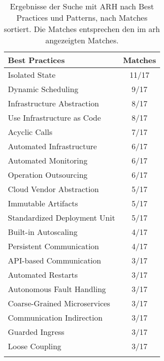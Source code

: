 \begin{table}[!htb]
\begin{minipage}{.5\linewidth}
		\begin{tabular}{p{5cm} c}
			\toprule
			\textbf{Best Practices} & \textbf{Matches} \\ \midrule
			Isolated State                        & 11/17 \\ \hline
			Dynamic Scheduling                    & 9/17 \\ \hline
			Infrastructure Abstraction            & 8/17 \\ \hline
			Use Infrastructure as Code            & 8/17 \\ \hline
			Acyclic Calls                         & 7/17 \\ \hline
			Automated Infrastructure              & 6/17 \\ \hline
			Automated Monitoring                  & 6/17 \\ \hline
			Operation Outsourcing                 & 6/17 \\ \hline
			Cloud Vendor Abstraction              & 5/17 \\ \hline
			Immutable Artifacts                   & 5/17 \\ \hline
			Standardized Deployment Unit          & 5/17 \\ \hline
			Built-in Autoscaling                  & 4/17 \\ \hline
			Persistent Communication              & 4/17 \\ \hline
			API-based Communication               & 3/17 \\ \hline
			Automated Restarts                    & 3/17 \\ \hline
			Autonomous Fault Handling             & 3/17 \\ \hline
			Coarse-Grained Microservices          & 3/17 \\ \hline
			Communication Indirection             & 3/17 \\ \hline
			Guarded Ingress                       & 3/17 \\ \hline
			Loose Coupling                        & 3/17 \\ \bottomrule
			\\
		\end{tabular}
	\end{minipage}
	
	\caption[Ergebnisse der Suche mit ARH nach Best Practices und Patterns]{
		Ergebnisse der Suche mit ARH nach Best Practices und Patterns, nach Matches sortiert.
		Die Matches entsprechen den im \gls{arh} angezeigten Matches.
	}
	\label{tab:interviews-patterns}
\end{table}

